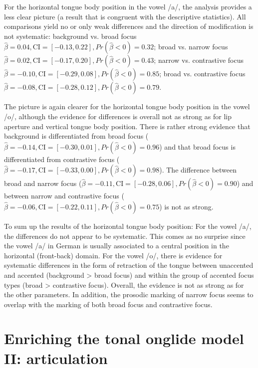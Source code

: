 For the horizontal tongue body position in the vowel /a/, the analysis provides a less clear picture (a result that is congruent with the descriptive statistics). All comparisons yield no or only weak differences and the direction of modification is not systematic: background vs. broad focus $\hat\beta=0.04 , \text{CI}=[-0.13, 0.22], \allowbreak Pr(\hat\beta<0)=0.32$; broad vs. narrow focus $\hat\beta=0.02 , \text{CI}=[-0.17, 0.20], \allowbreak Pr(\hat\beta<0)=0.43$; narrow vs. contrastive focus $\hat\beta=-0.10 , \text{CI}=[-0.29, 0.08], \allowbreak Pr(\hat\beta<0)=0.85$; broad vs. contrastive focus $\hat\beta=-0.08 , \text{CI}=[-0.28, 0.12], \allowbreak Pr(\hat\beta<0)=0.79$.

The picture is again clearer for the horizontal tongue body position in the vowel /o/, although the evidence for differences is overall not as strong as for lip aperture and vertical tongue body position. There is rather strong evidence that background is differentiated from broad focus  ($\hat\beta=-0.14, \text{CI}=[-0.30, 0.01], \allowbreak Pr(\hat\beta<0)=0.96$) and that broad focus is differentiated from contrastive focus ($\hat\beta=-0.17 , \text{CI}=[-0.33, 0.00], \allowbreak Pr(\hat\beta<0)=0.98$). The difference between broad and narrow focus ($\hat\beta=-0.11 , \text{CI}=[-0.28, 0.06], \allowbreak Pr(\hat\beta<0)=0.90$) and between narrow and contrastive focus ($\hat\beta=-0.06 , \text{CI}=[-0.22, 0.11], \allowbreak Pr(\hat\beta<0)=0.75$) is not as strong.

To sum up the results of the horizontal tongue body position: For the vowel /a/, the differences do not appear to be systematic. This comes as no surprise since the vowel /a/ in German is usually associated to a central position in the horizontal (front-back) domain. For the vowel /o/, there is evidence for systematic differences in the form of retraction of the tongue between unaccented and accented (background > broad focus) and within the group of accented focus types (broad > contrastive focus). Overall, the evidence is not as strong as for the other parameters. In addition, the prosodic marking of narrow focus seems to overlap with the marking of both broad focus and contrastive focus.

\section{Enriching the tonal onglide model II: articulation}

